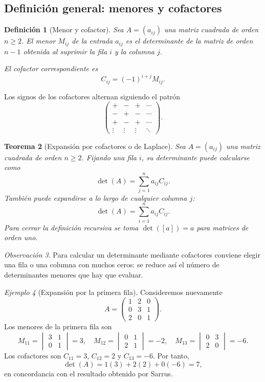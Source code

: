 \documentclass[12pt]{article}
\newtheorem{definicion}{Definición}[section]
\newtheorem{teorema}[definicion]{Teorema}
\theoremstyle{remark}
\newtheorem{observacion}[definicion]{Observación}
\newtheorem{ejemplo}[definicion]{Ejemplo}
\begin{document}
\subsection{Definición general: menores y cofactores}
\begin{definicion}[Menor y cofactor]
Sea $A=(a_{ij})$ una matriz cuadrada de orden $n\ge2$. El \emph{menor} $M_{ij}$ de la entrada $a_{ij}$ es el determinante de la matriz de orden $n-1$ obtenida al suprimir la fila $i$ y la columna $j$.

El \emph{cofactor} correspondiente es
\[
C_{ij}=(-1)^{i+j}M_{ij}.
\]
\end{definicion}

Los signos de los cofactores alternan siguiendo el patrón
\[
\begin{pmatrix}
+&-&+&\cdots\\-&+&-&\cdots\\+&-&+&\cdots\\\vdots&\vdots&\vdots&\ddots
\end{pmatrix}.
\]

\begin{teorema}[Expansión por cofactores o de Laplace]
Sea $A=(a_{ij})$ una matriz cuadrada de orden $n\ge2$. Fijando una fila $i$, su determinante puede calcularse como
\[
\boxed{\det(A)=\sum_{j=1}^{n}a_{ij}C_{ij}.}
\]
También puede expandirse a lo largo de cualquier columna $j$:
\[
\det(A)=\sum_{i=1}^{n}a_{ij}C_{ij}.
\]
Para cerrar la definición recursiva se toma $\det([a])=a$ para matrices de orden uno.
\end{teorema}

\begin{observacion}
Para calcular un determinante mediante cofactores conviene elegir una fila o una columna con muchos ceros: se reduce así el número de determinantes menores que hay que evaluar.
\end{observacion}

\begin{ejemplo}[Expansión por la primera fila]
Consideremos nuevamente
\[
A=\begin{pmatrix}1&2&0\\0&3&1\\2&0&1\end{pmatrix}.
\]
Los menores de la primera fila son
\[
M_{11}=\begin{vmatrix}3&1\\0&1\end{vmatrix}=3,\quad
M_{12}=\begin{vmatrix}0&1\\2&1\end{vmatrix}=-2,\quad
M_{13}=\begin{vmatrix}0&3\\2&0\end{vmatrix}=-6.
\]
Los cofactores son $C_{11}=3$, $C_{12}=2$ y $C_{13}=-6$. Por tanto,
\[
\det(A)=1(3)+2(2)+0(-6)=\boxed{7},
\]
en concordancia con el resultado obtenido por Sarrus.
\end{ejemplo}
\end{document}
